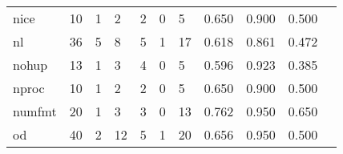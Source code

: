 \begin{longtable}{lp{1.20cm}p{1.20cm}p{1.20cm}p{1.20cm}p{1.20cm}p{1.20cm}p{1.20cm}p{1.20cm}p{1.20cm}p{1.20cm}}
nice      &                                    10 &                                                  1 &                                                  2 &                                                  2 &                                                  0 &                                                  5 &                                         0.650 &                                              0.900 &                                              0.500 \\
nl        &                                    36 &                                                  5 &                                                  8 &                                                  5 &                                                  1 &                                                 17 &                                         0.618 &                                              0.861 &                                              0.472 \\
nohup     &                                    13 &                                                  1 &                                                  3 &                                                  4 &                                                  0 &                                                  5 &                                         0.596 &                                              0.923 &                                              0.385 \\
nproc     &                                    10 &                                                  1 &                                                  2 &                                                  2 &                                                  0 &                                                  5 &                                         0.650 &                                              0.900 &                                              0.500 \\
numfmt    &                                    20 &                                                  1 &                                                  3 &                                                  3 &                                                  0 &                                                 13 &                                         0.762 &                                              0.950 &                                              0.650 \\
od        &                                    40 &                                                  2 &                                                 12 &                                                  5 &                                                  1 &                                                 20 &                                         0.656 &                                              0.950 &                                              0.500 \\

\end{longtable}
